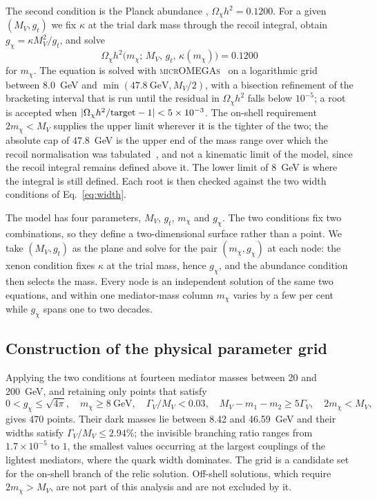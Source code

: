 The second condition is the Planck abundance \cite{PLANCK}, $\Omega_\chi h^2=0.1200$. For a given $(M_V,g_t)$ we fix $\kappa$ at the trial dark mass through the recoil integral, obtain $g_\chi=\kappa M_V^2/g_t$, and solve
\begin{equation}
\Omega_\chi h^2\big(m_\chi;\,M_V,\,g_t,\,\kappa(m_\chi)\big)=0.1200
\label{eq:relic}
\end{equation}
for $m_\chi$. The equation is solved with \textsc{micrOMEGAs}~\cite{MICROMEGAS} on a logarithmic grid between $8.0$~GeV and $\min(47.8\ \mathrm{GeV},M_V/2)$, with a bisection refinement of the bracketing interval that is run until the residual in $\Omega_\chi h^2$ falls below $10^{-5}$; a root is accepted when $|{\Omega_\chi h^2}/{\rm target}-1|<5\times10^{-3}$. The on-shell requirement $2m_\chi<M_V$ supplies the upper limit wherever it is the tighter of the two; the absolute cap of $47.8$~GeV is the upper end of the mass range over which the recoil normalisation was tabulated~\cite{LZ}, and not a kinematic limit of the model, since the recoil integral remains defined above it. The lower limit of $8$~GeV is where the integral is still defined. Each root is then checked against the two width conditions of Eq.~\eqref{eq:width}.

The model has four parameters, $M_V$, $g_t$, $m_\chi$ and $g_\chi$. The two conditions fix two combinations, so they define a two-dimensional surface rather than a point. We take $(M_V,g_t)$ as the plane and solve for the pair $(m_\chi,g_\chi)$ at each node: the xenon condition fixes $\kappa$ at the trial mass, hence $g_\chi$, and the abundance condition then selects the mass. Every node is an independent solution of the same two equations, and within one mediator-mass column $m_\chi$ varies by a few per cent while $g_\chi$ spans one to two decades.


\subsection{Construction of the physical parameter grid}

Applying the two conditions at fourteen mediator masses between 20 and 200~GeV, and retaining only points that satisfy
\begin{equation}
0<g_\chi\le\sqrt{4\pi},\quad
m_\chi\ge8\ \mathrm{GeV},\quad
\Gamma_V/M_V<0.03,\quad
M_V-m_1-m_2\ge5\Gamma_V,\quad
2m_\chi<M_V,
\label{eq:cuts}
\end{equation}
gives 470 points. Their dark masses lie between 8.42 and 46.59~GeV and their widths satisfy $\Gamma_V/M_V\le2.94\%$; the invisible branching ratio ranges from $1.7\times10^{-5}$ to $1$, the smallest values occurring at the largest couplings of the lightest mediators, where the quark width dominates. The grid is a candidate set for the on-shell branch of the relic solution. Off-shell solutions, which require $2m_\chi>M_V$, are not part of this analysis and are not excluded by it.

